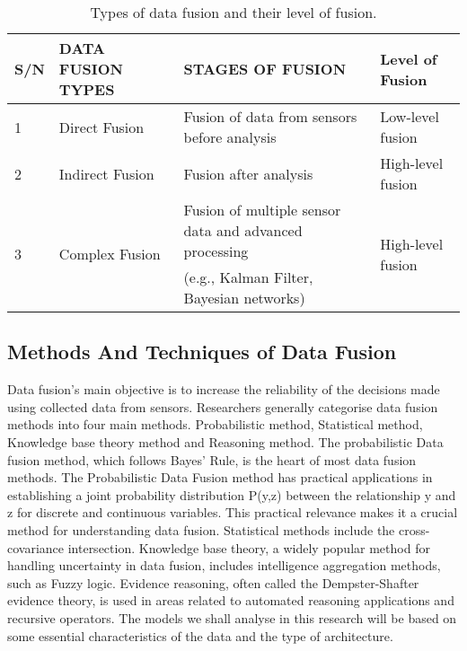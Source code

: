 \begin{table}[htbp]
\caption{Types of data fusion and their level of fusion.\label{tab1}}
\begin{tabularx}{\textwidth}{|l|l|X|l|}
\hline
\textbf{S/N} & \textbf{DATA FUSION TYPES} & \textbf{STAGES OF FUSION} & \textbf{Level of Fusion} \\
\hline
1 & Direct Fusion & Fusion of data from sensors before analysis & Low-level fusion \\
2 & Indirect Fusion & Fusion after analysis & High-level fusion \\
\hline
\multirow{2}{*}{3} & \multirow{2}{*}{Complex Fusion} & \raggedright Fusion of multiple sensor data and advanced processing & \multirow{2}{*}{High-level fusion} \\
& & \raggedright (e.g., Kalman Filter, Bayesian networks) & \\
\hline
\end{tabularx}
\end{table}
\subsection{Methods And Techniques of Data Fusion}
Data fusion's main objective is to increase the reliability of the decisions made using collected data from sensors. Researchers generally categorise data fusion methods into four main methods. 	  
Probabilistic method, Statistical method, Knowledge base theory method and  Reasoning method. The probabilistic Data fusion method, which follows Bayes' Rule, is the heart of most data fusion methods. The Probabilistic Data Fusion method has practical applications in establishing a joint probability distribution P(y,z) between the relationship y and z for discrete and continuous variables. This practical relevance makes it a crucial method for understanding data fusion. 
Statistical methods include the cross-covariance intersection. Knowledge base theory, a widely popular method for handling uncertainty in data fusion, includes intelligence aggregation methods, such as Fuzzy logic. Evidence reasoning, often called the Dempster-Shafter evidence theory, is used in areas related to automated reasoning applications and recursive operators.  
The models we shall analyse in this research will be based on some essential characteristics of the data and the type of architecture. 

